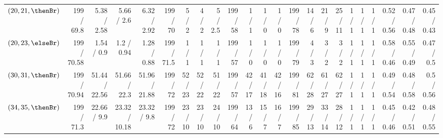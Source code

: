 \begin{table*}
{\begin{tabular}{l|rrrr|rrrr|rrrr|rrrr|r|r|r|r|r|r}
    $(20,21,\thenBr)$    & 199    / 69.8    & 5.38   / 2.58    & 5.66   / 2.6    & 6.32   / 2.92   & 199  / 70       & 5   / 2       & 4   / 2       & 5   / 2.5      & 199  / 58  & 1   / 1   & 1   / 0  & 1   / 0   & 199  / 78  & 14  / 6   & 21  / 9   & 25  / 11  & 1 / 1 & 1 / 1 & 1 / 1 & 0.52 / 0.56 & 0.47 / 0.48 & 0.45 / 0.43 \\
    $(20,23,\elseBr)$    & 199    / 70.58   & 1.54   / 0.9     & 1.2    / 0.94   & 1.28   / 0.88   & 199  / 71.5     & 1   / 1       & 1   / 1       & 1   / 1        & 199  / 57  & 1   / 0   & 1   / 0  & 1   / 0   & 199  / 79  & 4   / 3   & 3   / 2   & 3   / 2   & 1 / 1 & 1 / 1 & 1 / 1 & 0.58 / 0.46 & 0.55 / 0.49 & 0.47 / 0.5 \\
    $(30,31,\thenBr)$    & 199    / 70.94   & 51.44  / 22.56   & 51.66  / 22.3   & 51.96  / 21.88  & 199  / 72       & 52  / 23      & 52  / 22      & 51  / 22       & 199  / 57  & 42  / 17  & 41  / 18 & 42  / 16  & 199  / 81  & 62  / 28  & 61  / 27  & 62  / 27  & 1 / 1 & 1 / 1 & 1 / 1 & 0.49 / 0.54 & 0.48 / 0.58 & 0.5 / 0.56 \\
    $(34,35,\thenBr)$    & 199    / 71.3    & 22.66  / 9.9     & 23.32  / 10.18  & 23.32  / 9.8    & 199  / 72       & 23  / 10      & 23  / 10      & 24  / 10       & 199  / 64  & 13  / 6   & 15  / 7  & 16  / 7   & 199  / 85  & 29  / 13  & 33  / 14  & 28  / 12  & 1 / 1 & 1 / 1 & 1 / 1 & 0.45 / 0.46 & 0.42 / 0.51 & 0.48 / 0.55 \\
    \bottomrule
    \end{tabular}
}
\end{table*}

